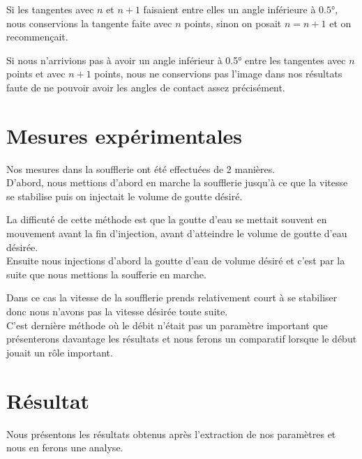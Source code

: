 \documentclass[french]{article}
\begin{document}
Si les tangentes avec $n$ et $n+1$ faisaient entre elles un angle inférieure à $\ang{0.5}$, nous conservions la tangente faite avec $n$ points, sinon on posait $n = n+1$ et on recommençait.

Si nous n'arrivions pas à avoir un angle inférieur à \ang{0.5}  entre les tangentes avec $n$ points et avec $n+1$ points, nous ne conservions pas l'image dans nos résultats faute de ne pouvoir avoir les angles de contact assez précisément.

\section{Mesures expérimentales}

Nos mesures dans la soufflerie ont été effectuées de 2 manières.\\

D'abord, nous mettions d'abord en marche la soufflerie jusqu'à ce que la vitesse se stabilise puis on injectait le volume de goutte désiré.

La difficuté de cette méthode est que la goutte d'eau se mettait souvent en mouvement avant la fin d'injection, avant d'atteindre le volume de goutte d'eau désirée.\\

Ensuite nous injections d'abord la goutte d'eau de volume désiré et c'est par la suite que nous mettions la soufferie en marche.

Dans ce cas la vitesse de la soufflerie prends relativement court à se stabiliser donc nous n'avons pas la vitesse désirée toute suite.\\

C'est dernière méthode où le débit n'était pas un paramètre important que présenterons davantage les résultats et nous ferons un comparatif lorsque le début jouait un rôle important.

\section{Résultat}

Nous présentons les résultats obtenus après l'extraction de nos paramètres et nous en ferons une analyse.
\end{document}
